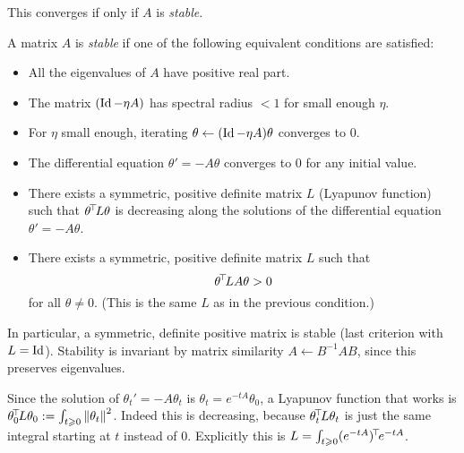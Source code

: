 \documentclass[11pt,a4paper]{article}
\begin{document}
This converges if only if $A$ is \emph{stable}.


\begin{defi}
A matrix $A$ is \emph{stable} if one of the following equivalent
conditions are satisfied:
\begin{itemize}
\item All the eigenvalues of $A$ have positive real part.
\item The matrix $(\operatorname{Id}-\eta A)$ has spectral radius $<1$ for small enough
$\eta$.
\item For $\eta$ small enough, iterating $\theta\gets (\operatorname{Id}-\eta A)\theta$
converges to $0$.
\item The differential equation $\theta'=-A\theta$ converges to $0$ for
any initial value.
\item There exists a symmetric, positive definite matrix $L$ (Lyapunov
function) such that $\theta^{\!\top}\!L\theta$ is decreasing along the
solutions of the differential equation $\theta'=-A\theta$.
\item There exists a symmetric, positive definite matrix $L$ such that
\begin{equation}
\theta^{\!\top}\! L A \theta>0
\end{equation}
for all $\theta\neq 0$. (This is the same $L$ as in the previous
condition.)
\end{itemize}
\end{defi}

In particular, a symmetric, definite positive matrix is stable (last
criterion with $L=\operatorname{Id}$).
Stability is invariant by matrix similarity $A\gets B^{-1}A B$, since
this preserves eigenvalues.

Since the
solution of $\theta_t'=-A\theta_t$ is $\theta_t=e^{-tA}\theta_0$, a
Lyapunov function that works is $\theta_0^{\!\top}\!L\theta_0\mathrel{\mathop{:}}= \int_{t \geqslant 0}
\left\lVert\theta_t\right\rVert^2$. Indeed this is decreasing, because
$\theta_t^{\!\top}\!L\theta_t$ is just the same integral starting at $t$
instead of $0$. Explicitly this is
$L=\int_{t\geqslant 0} (e^{-t A})^{\!\top}\!
e^{-tA}$.
\end{document}
